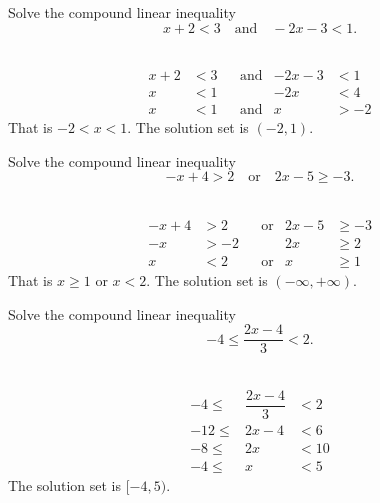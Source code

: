 \documentclass[
  en,11pt]{elegantbook}
\let\BeginKnitrBlock\begin \let\EndKnitrBlock\end
\begin{document}
\BeginKnitrBlock{example}
\protect\hypertarget{exm:unnamed-chunk-198}{}{\label{exm:unnamed-chunk-198} }
Solve the compound linear inequality
\[
x+2<3\quad \text{and}\quad -2x-3<1.
\]
\EndKnitrBlock{example}

\BeginKnitrBlock{solution}
{}\\

\[
\begin{aligned}
    x+2 & <3 &  & \text{and} & -2x-3 & <1  \\
    x   & <1 &  &            & -2x   & <4  \\
    x   & <1 &  & \text{and} & x     & >-2
\end{aligned}
\]
That is \(-2<x<1\). The solution set is \((-2, 1)\).
\EndKnitrBlock{solution}

\BeginKnitrBlock{example}
\protect\hypertarget{exm:unnamed-chunk-200}{}{\label{exm:unnamed-chunk-200} }
Solve the compound linear inequality\\
\[
-x+4>2 \quad \text{or} \quad 2x-5\geq -3.
\]
\EndKnitrBlock{example}

\BeginKnitrBlock{solution}
{}\\

\[
\begin{aligned}
    -x+4 & >2  &  & \text{or} & 2x-5 & \geq -3 \\
    -x   & >-2 &  &           & 2x   & \geq 2  \\
    x    & <2  &  & \text{or} & x    & \geq 1
\end{aligned}
\]
That is \(x\geq 1\) or \(x< 2\). The solution set is \((-\infty, +\infty)\).
\EndKnitrBlock{solution}

\BeginKnitrBlock{example}
\protect\hypertarget{exm:unnamed-chunk-202}{}{\label{exm:unnamed-chunk-202} }
Solve the compound linear inequality
\[
-4\leq\dfrac{2x-4}{3}<2.
\]
\EndKnitrBlock{example}

\BeginKnitrBlock{solution}
{}\\

\[
\begin{array}{rcl}
    -4\leq  & \dfrac{2x-4}{3}    & <2  \\
    -12\leq & 2x-4         & <6  \\
    -8\leq  & 2x                & <10 \\
    -4\leq  & x               & <5  
\end{array}
\]
The solution set is \([-4, 5)\).
\EndKnitrBlock{solution}
\end{document}

